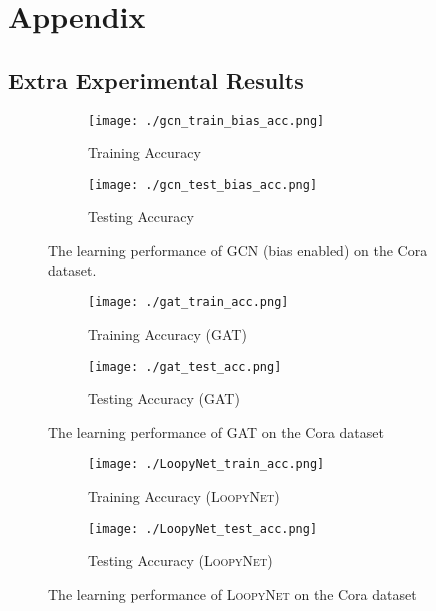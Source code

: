 \documentclass{article}
\newcommand{\gcn}{\textsc{GCN}}
\newcommand{\gat}{\textsc{GAT}}
\newcommand{\loopy}{\textsc{LoopyNet}}
\begin{document}
\newpage




\newpage
\section{Appendix}\label{sec:appendix}

\subsection{Extra Experimental Results}


\begin{figure}[h]
    \centering
    \begin{subfigure}[b]{.45\textwidth}
    	\texttt{[image: ./gcn\_train\_bias\_acc.png]}
    	\caption{Training Accuracy}\label{fig:gcn_bias_enabled_acc_train}
    \end{subfigure}\hfill
    \begin{subfigure}[b]{.465\textwidth}
    	\texttt{[image: ./gcn\_test\_bias\_acc.png]}
    	\caption{Testing Accuracy}\label{fig:gcn_bias_enabled_acc_test}
    \end{subfigure}\caption{The learning performance of {\gcn} (bias enabled) on the Cora dataset.}\label{fig:gcn_acc_analysis_bias_enabled}
\end{figure}


\begin{figure}[h]
    \centering
    \begin{subfigure}[b]{.4\textwidth}
    	\texttt{[image: ./gat\_train\_acc.png]}
    	\caption{Training Accuracy ({\gat})}\label{fig:gat_acc_train}
    \end{subfigure}\hfill
    \begin{subfigure}[b]{.4\textwidth}
    	\texttt{[image: ./gat\_test\_acc.png]}
    	\caption{Testing Accuracy ({\gat})}\label{fig:gat_acc_test}
    \end{subfigure}\caption{The learning performance of {\gat} on the Cora dataset}\label{fig:gresnet_gat_analysis}
\end{figure}


\begin{figure}[h]
    \centering
    \begin{subfigure}[b]{.4\textwidth}
    	\texttt{[image: ./LoopyNet\_train\_acc.png]}
    	\caption{Training Accuracy ({\loopy})}\label{fig:loopy_acc_train}
    \end{subfigure}\hfill
    \begin{subfigure}[b]{.4\textwidth}
    	\texttt{[image: ./LoopyNet\_test\_acc.png]}
    	\caption{Testing Accuracy ({\loopy})}\label{fig:loopy_acc_test}
    \end{subfigure}\caption{The learning performance of {\loopy} on the Cora dataset}\label{fig:gresnet_loopy_analysis}
\end{figure}
\end{document}
